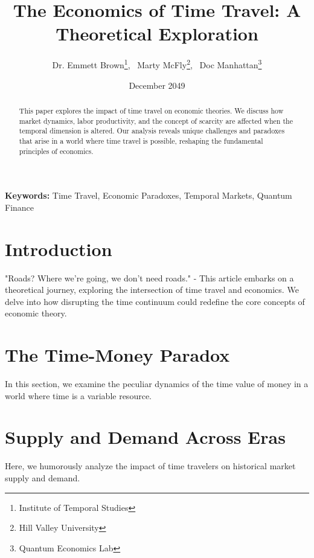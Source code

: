 \documentclass[11pt,a4paper]{article}
\title{The Economics of Time Travel: A Theoretical Exploration}
\author{
    Dr. Emmett Brown\thanks{Institute of Temporal Studies},~
    Marty McFly\thanks{Hill Valley University},~
    Doc Manhattan\thanks{Quantum Economics Lab}
}
\date{December 2049\\[3em]
\textbf{}
}
\begin{document}
\maketitle


\begin{abstract}
\noindent This paper explores the impact of time travel on economic theories. We discuss how market dynamics, labor productivity, and the concept of scarcity are affected when the temporal dimension is altered. Our analysis reveals unique challenges and paradoxes that arise in a world where time travel is possible, reshaping the fundamental principles of economics.
\end{abstract}

\vspace{3em}

\noindent
\textbf{Keywords:} Time Travel, Economic Paradoxes, Temporal Markets, Quantum Finance

\newpage


\section{Introduction}
"Roads? Where we're going, we don't need roads." - This article embarks on a theoretical journey, exploring the intersection of time travel and economics. We delve into how disrupting the time continuum could redefine the core concepts of economic theory.


\section{The Time-Money Paradox}
In this section, we examine the peculiar dynamics of the time value of money in a world where time is a variable resource.

\section{Supply and Demand Across Eras}
Here, we humorously analyze the impact of time travelers on historical market supply and demand.
\end{document}
